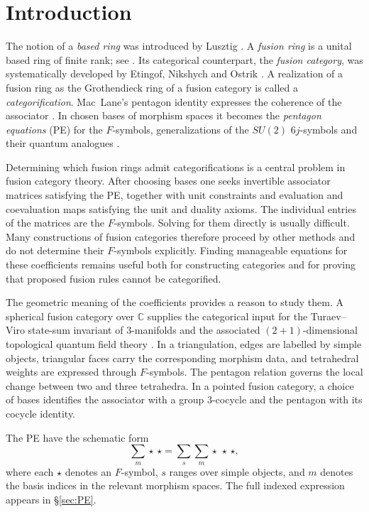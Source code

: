 \documentclass{amsart}
\begin{document}
\section{Introduction}\label{sec:intro}
The notion of a \emph{based ring} was introduced by Lusztig \cite{Lus}. A \emph{fusion ring} is a unital based ring of finite rank; see \cite[Definition~3.1.7]{EGNO15}. Its categorical counterpart, the \emph{fusion category}, was systematically developed by Etingof, Nikshych and Ostrik \cite{ENO05}. A realization of a fusion ring as the Grothendieck ring of a fusion category is called a \emph{categorification}. Mac~Lane's pentagon identity expresses the coherence of the associator \cite{MacLane}. In chosen bases of morphism spaces it becomes the \emph{pentagon equations} (PE) for the $F$-symbols, generalizations of the $SU(2)$ $6j$-symbols and their quantum analogues \cite{Bon07,DaHaWa,wang}.

Determining which fusion rings admit categorifications is a central problem in fusion category theory. After choosing bases one seeks invertible associator matrices satisfying the PE, together with unit constraints and evaluation and coevaluation maps satisfying the unit and duality axioms. The individual entries of the matrices are the $F$-symbols. Solving for them directly is usually difficult. Many constructions of fusion categories therefore proceed by other methods and do not determine their $F$-symbols explicitly. Finding manageable equations for these coefficients remains useful both for constructing categories and for proving that proposed fusion rules cannot be categorified.

The geometric meaning of the coefficients provides a reason to study them. A spherical fusion category over $\mathbb C$ supplies the categorical input for the Turaev--Viro state-sum invariant of $3$-manifolds and the associated $(2+1)$-dimensional topological quantum field theory \cite{TurVir92,BW96}. In a triangulation, edges are labelled by simple objects, triangular faces carry the corresponding morphism data, and tetrahedral weights are expressed through $F$-symbols. The pentagon relation governs the local change between two and three tetrahedra. In a pointed fusion category, a choice of bases identifies the associator with a group $3$-cocycle and the pentagon with its cocycle identity.

The PE have the schematic form
\begin{equation}\tag{PE}\label{Equ:PE}
 \sum_m\star\,\star=\sum_s\sum_m\star\,\star\,\star,
\end{equation}
where each $\star$ denotes an $F$-symbol, $s$ ranges over simple objects, and $m$ denotes the basis indices in the relevant morphism spaces. The full indexed expression appears in \S\ref{sec:PE}.
\end{document}
